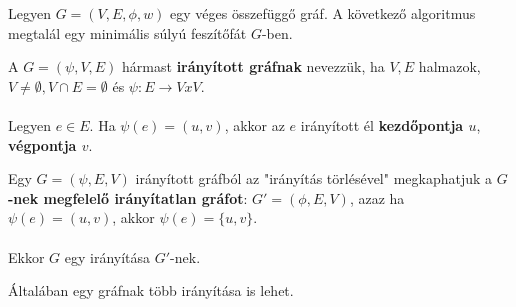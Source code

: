 \documentclass{beamer}
\begin{document}
\begin{frame}
\begin{tcolorbox}[title={Tétel: Kruskal algoritmus}]
Legyen $G = (V, E, {\phi}, w)$ egy véges összefüggő gráf. A következő algoritmus megtalál egy minimális súlyú feszítőfát $G$-ben.
\end{tcolorbox}

\end{frame}

\begin{frame}
\begin{tcolorbox}[title={Def.: Irányított gráf}]
A $G = ({\psi}, V, E)$ hármast \textbf{irányított gráfnak} nevezzük, ha $V, E$ halmazok, $V \neq \emptyset, V \cap E = \emptyset$ és $\psi : E \rightarrow V x V$.\\
\\
Legyen $e \in E$. Ha ${\psi}(e) = (u, v)$, akkor az $e$ irányított él \textbf{kezdőpontja $u$}, \textbf{végpontja $v$}.
\end{tcolorbox}

\begin{tcolorbox}[title={Def.: Gráf irányítása}]
Egy $G = ({\psi}, E, V)$ irányított gráfból az "irányítás törlésével" megkaphatjuk a \textbf{$G$-nek megfelelő irányítatlan gráfot}: $G' = ({\phi}, E, V)$, azaz ha ${\psi}(e) = (u, v)$, akkor ${\psi}(e) = \{u, v\}$.\\
\\
Ekkor $G$ egy irányítása $G'$-nek.
\end{tcolorbox}

\begin{tcolorbox}[title={Ész}]
Általában egy gráfnak több irányítása is lehet.
\end{tcolorbox}
\end{frame}
\end{document}
